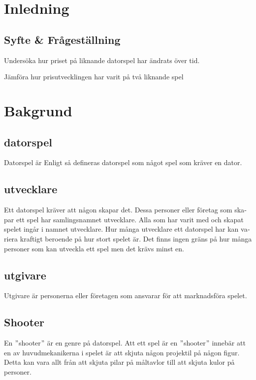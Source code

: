 \documentclass[11p]{article}
\begin{document}
    \begin{otherlanguage}{swedish}
    \tableofcontents

    \newpage

\setlength{\parskip}{10pt}

\section{Inledning}

\subsection{Syfte & Frågeställning}
    Undersöka hur priset på liknande datorspel har ändrats över tid.


    Jämföra hur prisutvecklingen har varit på två liknande spel
\section{Bakgrund}

    \subsection{datorspel}
    Datorspel är
    Enligt \textcite{ComputerSweden} så defineras datorspel som något spel som kräver en dator.

    \subsection{utvecklare}
    Ett datorspel kräver att någon skapar det.
    Dessa personer eller företag som skapar ett spel har samlingsnamnet utvecklare.
    Alla som har varit med och skapat spelet ingår i namnet utvecklare.
    Hur många utvecklare ett datorspel har kan variera kraftigt beroende på hur stort spelet är.
    Det finns ingen gräns på hur många personer som kan utveckla ett spel men det krävs minst en.

    \subsection{utgivare}
    Utgivare är personerna eller företagen som ansvarar för att marknadsföra spelet.

    \subsection{Shooter}
    En \("\)shooter\("\) är en genre på datorspel.
    Att ett spel är en \("\)shooter\("\) innebär att en av huvudmekanikerna i spelet är att skjuta någon projektil på någon figur.
    Detta kan vara allt från att skjuta pilar på måltavlor till att skjuta kulor på personer.


\end{otherlanguage}
\end{document}
